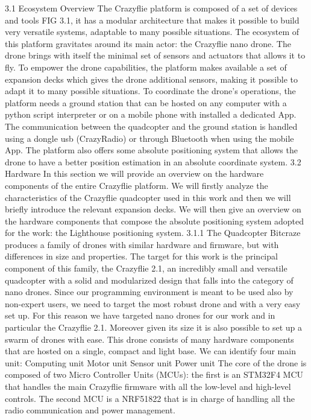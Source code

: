 3.1 Ecosystem Overview
The Crazyflie platform is composed of a set of devices and tools {FIG 3.1}, it has a modular architecture that makes it possible to build very versatile systems, adaptable to many possible situations. The ecosystem of this platform gravitates around its main actor: the Crazyflie nano drone. The drone brings with itself the minimal set of sensors and actuators that allows it to fly. To empower the drone capabilities, the platform makes available a set of expansion decks which gives the drone additional sensors, making it possible to adapt it to many possible situations.
To coordinate the drone’s operations, the platform needs a ground station that can be hosted on any computer with a python script interpreter or on a mobile phone with installed a dedicated App. The communication between the quadcopter and the ground station is handled using a dongle usb (CrazyRadio) or through Bluetooth when using the mobile App.
The platform also offers some absolute positioning system that allows the drone to have a better position estimation in an absolute coordinate system.
3.2 Hardware
In this section we will provide an overview on the hardware components of the entire Crazyflie platform. We will firstly analyze the characteristics of the Crazyflie quadcopter used in this work and then we will briefly introduce the relevant expansion decks. We will then give an overview on the hardware components that compose the absolute positioning system adopted for the work: the Lighthouse positioning system.
3.1.1 The Quadcopter
Bitcraze produces a family of drones with similar hardware and firmware, but with differences in size and properties. The target for this work is the principal component of this family, the Crazyflie 2.1, an incredibly small and versatile quadcopter with a solid and modularized design that falls into the category of nano drones. Since our programming environment is meant to be used also by non-expert users, we need to target the most robust drone and with a very easy set up. For this reason we have targeted nano drones for our work and in particular the Crazyflie 2.1. Moreover given its size it is also possible to set up a swarm of drones with ease.
This drone consists of many hardware components that are hosted on a single, compact and light base. We can identify four main unit:
Computing unit
Motor unit
Sensor unit
Power unit
The core of the drone is composed of two Micro Controller Units (MCUs): the first is an STM32F4 MCU that handles the main Crazyflie firmware with all the low-level and high-level controls. The second MCU is a NRF51822 that is in charge of handling all the radio communication and power management. 
